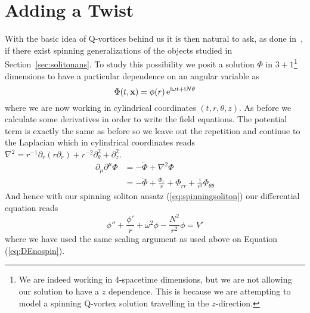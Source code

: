 \section{Adding a Twist}
With the basic idea of Q-vortices behind us it is then natural to ask, as done
in~\cite{spinningq}, if there exist spinning generalizations of the objects
studied in Section~\ref{sec:solitonans}. To study this possibility we posit a
solution \(\Phi\) in \(3 + 1\)\footnote{We are indeed working in 4-spacetime
    dimensions, but we are not allowing our solution to have a \(z\) dependence.
    This is because we are attempting to model a spinning Q-vortex solution
    travelling in the \(z\)-direction.} dimensions to have a particular dependence
on an angular variable as
\begin{equation}\label{eq:spinningsoliton}
    \Phi(t, \mathbf{x}) = \phi(r)\,\mathrm{e}^{\mathrm{i}\omega t + \mathrm{i} N\theta}
\end{equation}
where we are now working in cylindrical coordinates \((t, r, \theta, z)\). As
before we calculate some derivatives in order to write the field equations. The
potential term is exactly the same as before so we leave out the repetition and
continue to the Laplacian which in cylindrical coordinates reads
\(\nabla^2 = r^{-1}\partial_r\left(r\partial_r\right) + r^{-2}\partial_\theta^2 + \partial_z^2\).
\begin{align}
    \partial_\mu\partial^\mu\Phi & = -\ddot{\Phi} + \nabla^2\Phi                                                     \\
                                 & = -\ddot{\Phi} + \frac{\Phi_r}{r}  + \Phi_{rr} + \frac{1}{r^2}\Phi_{\theta\theta}
\end{align}
And hence with our spinning soliton ansatz (\ref{eq:spinningsoliton}) our
differential equation reads
\begin{equation}\label{eq:DE}
    \phi'' + \frac{\phi'}{r} + \omega^2\phi - \frac{N^2}{r^2}\phi = V'
\end{equation}
where we have used the same scaling argument as used above on Equation (\ref{eq:DEnospin}).

